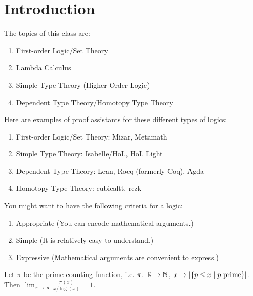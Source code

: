 \section{Introduction}

The topics of this class are: 
\begin{enumerate}
    \item First-order Logic/Set Theory
    \item Lambda Calculus
    \item Simple Type Theory (Higher-Order Logic)
    \item Dependent Type Theory/Homotopy Type Theory
\end{enumerate}

\begin{example}
    Here are examples of proof assistants for these different types of logics: 
    \begin{enumerate}
        \item First-order Logic/Set Theory: Mizar, Metamath
        \item Simple Type Theory: Isabelle/HoL, HoL Light
        \item Dependent Type Theory: Lean, Rocq (formerly Coq), Agda
        \item Homotopy Type Theory: cubicaltt, rezk
    \end{enumerate}
\end{example}

\begin{rem}
    You might want to have the following criteria for a logic: 
    \begin{enumerate}
        \item Appropriate (You can encode mathematical arguments.)
        \item Simple (It is relatively easy to understand.)
        \item Expressive (Mathematical arguments are convenient to express.)
    \end{enumerate}
\end{rem}

\begin{thm}
Let $\pi$ be the prime counting function, i.e. $\pi \colon \mathbb{R} \to \mathbb{N}$, $x \mapsto \lvert \{ p \le x \mid p \text{\textup{ prime}} \} \rvert$.
    Then $\lim_{x \to \infty} \frac{\pi (x)}{x / \log(x)} = 1$.
\end{thm}

